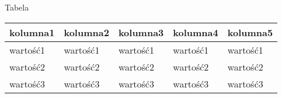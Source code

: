 \documentclass[12pt,a4paper]{article}
\begin{document}
Tabela \cite{knuth84}

\begin{table}[h!]
\begin{tabular}{|l|l|l|l|l|}
\hline
\multicolumn{1}{|c|}{\textbf{kolumna1}} & \textbf{kolumna2} & \textbf{kolumna3} & \textbf{kolumna4} & \multicolumn{1}{c|}{\textbf{kolumna5}} \\ \hline
wartość1                                & wartość1          & wartość1          & wartość1          & wartość1                               \\ \hline
wartość2                                & wartość2          & wartość2          & wartość2          & wartość2                               \\ \hline
wartość3                                & wartość3          & wartość3          & wartość3          & wartość3                               \\ \hline
\end{tabular}
\end{table}
\end{document}
